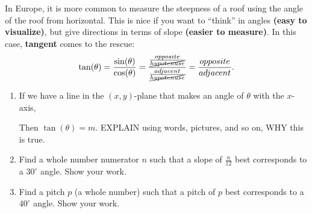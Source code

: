 \documentclass[noauthor,nooutcomes,hints,handout]{ximera}
\begin{document}
\begin{question}
In Europe, it is more common to measure the steepness of a roof using
the angle of the roof from horizontal. This is nice if you want to
``think'' in angles \textbf{(easy to visualize)}, but give directions
in terms of slope \textbf{(easier to measure)}. In this case,
\textbf{tangent} comes to the rescue:
\[
\tan(\theta) = \frac{\sin(\theta)}{\cos(\theta)} = \frac{\frac{opposite}{\cancel{hypotenuse}}}{\frac{adjacent}{\cancel{hypotenuse}}}=\frac{opposite}{adjacent}.
\]



\begin{enumerate}
\item If we have a line in the $(x,y)$-plane that makes an angle of
  $\theta$ with the $x$-axis,
  \begin{center}
  \end{center}
  Then $\tan(\theta) = m$. EXPLAIN using words, pictures, and so on,
  WHY this is true.
\item Find a whole number numerator $n$ such that a slope of
  $\frac{n}{12}$ best corresponds to a $30^\circ$ angle. Show your
  work.
\item Find a pitch $p$ (a whole number) such that a pitch of $p$ best
  corresponds to a $40^\circ$ angle. Show your work.


\end{enumerate}
\end{question}
\end{document}

